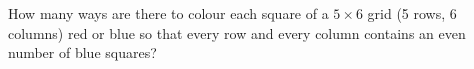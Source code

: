 How many ways are there to colour each square of a $5\times6$ grid (5 rows, 6 columns) red or blue so that every row and every column contains an even number of blue squares?
